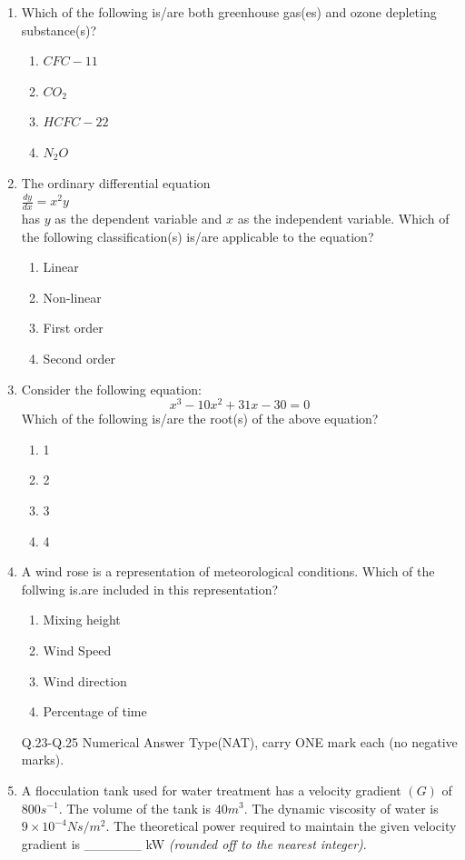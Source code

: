 \documentclass[journal]{IEEEtran}
\begin{document}
\begin{enumerate}[start=1]
\item Which of the following is/are both greenhouse gas(es) and ozone depleting substance(s)?
\hfill{}
\begin{enumerate}
    \item $CFC-11$
    \item $CO_2$
    \item $HCFC-22$
    \item $N_2O$
\end{enumerate}

\item The ordinary differential equation\\ $\frac{dy}{dx} = x^2y$ \\ has $y$ as the dependent variable and $x$ as the independent variable. Which of the following classification(s) is/are applicable to the equation?
\hfill{}
\begin{enumerate}
    \item Linear
    \item Non-linear
    \item First order
    \item Second order
\end{enumerate}

\item Consider the following equation:
$$x^3-10x^2+31x-30 = 0$$
     Which of the following is/are the root(s) of the above equation?
\hfill{}
\begin{enumerate}
    \item 1
    \item 2
    \item 3
    \item 4
\end{enumerate}

\item A wind rose is a representation of meteorological conditions. Which of the follwing is.are included in this representation?
\hfill{}
\begin{enumerate}
    \item Mixing height
    \item Wind Speed
    \item Wind direction
    \item Percentage of time
\end{enumerate}
\bigskip

Q.23-Q.25 Numerical Answer Type(NAT), carry ONE mark each (no negative marks).
\\
\item A flocculation tank used for water treatment has a velocity gradient $(G)$ of $800 s^{-1}$. The volume of the tank is $40 m^3$. The dynamic viscosity of water is $9\times10^{-4} Ns/m^2$. The theoretical power required to maintain the given velocity gradient is \_\_\_\_\_\_ kW \textit{(rounded off to the nearest integer)}.
\hfill{}


\end{enumerate}
\end{document}
